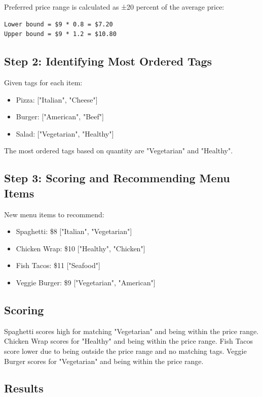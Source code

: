 Preferred price range is calculated as ±20 percent of the average price:
\begin{verbatim}
Lower bound = $9 * 0.8 = $7.20
Upper bound = $9 * 1.2 = $10.80
\end{verbatim}

\subsection*{Step 2: Identifying Most Ordered Tags}

Given tags for each item:
\begin{itemize}
    \item Pizza: ["Italian", "Cheese"]
    \item Burger: ["American", "Beef"]
    \item Salad: ["Vegetarian", "Healthy"]
\end{itemize}

The most ordered tags based on quantity are "Vegetarian" and "Healthy".

\subsection*{Step 3: Scoring and Recommending Menu Items}

New menu items to recommend:
\begin{itemize}
    \item Spaghetti: \$8 ["Italian", "Vegetarian"]
    \item Chicken Wrap: \$10 ["Healthy", "Chicken"]
    \item Fish Tacos: \$11 ["Seafood"]
    \item Veggie Burger: \$9 ["Vegetarian", "American"]
\end{itemize}

\subsection*{Scoring}

Spaghetti scores high for matching "Vegetarian" and being within the price range.
Chicken Wrap scores for "Healthy" and being within the price range.
Fish Tacos score lower due to being outside the price range and no matching tags.
Veggie Burger scores for "Vegetarian" and being within the price range.


\subsection*{Results}

